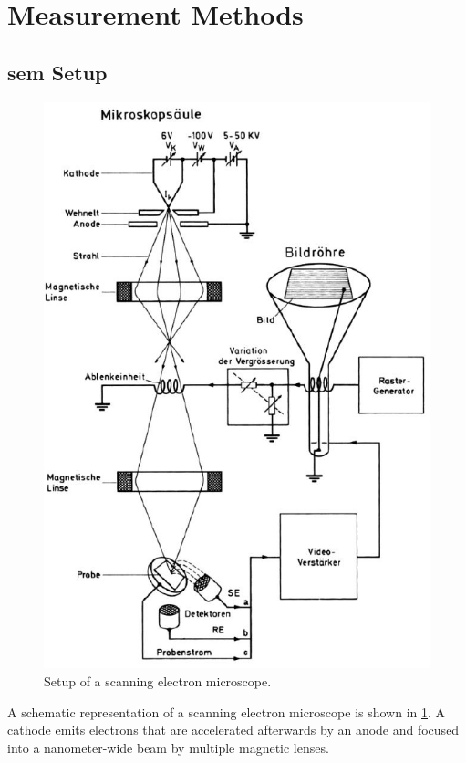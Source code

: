\section{Measurement Methods}

\subsection{\ac{sem} Setup}
\begin{figure}
	\centering
	\includegraphics[width=0.95\linewidth]{../assets/aufbau.png}
	\caption{Setup of a scanning electron microscope. }
	\label{fig:general_structure}
\end{figure}
A schematic	representation of a scanning electron microscope is shown in
\cref{fig:general_structure}.
A cathode emits electrons that are accelerated afterwards by an anode
and focused into a nanometer-wide beam by multiple magnetic lenses.

